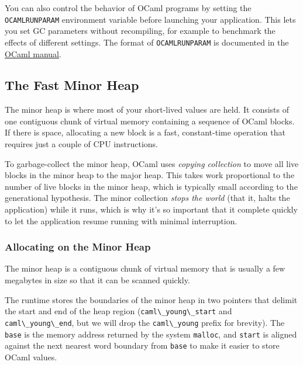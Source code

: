 You can also control the behavior of OCaml programs by setting the
\passthrough{\lstinline!OCAMLRUNPARAM!} environment variable before
launching your application. This lets you set GC parameters without
recompiling, for example to benchmark the effects of different settings.
The format of \passthrough{\lstinline!OCAMLRUNPARAM!} is documented in
the
\href{https://caml.inria.fr/pub/docs/manual-ocaml/runtime.html}{OCaml
manual}.

\hypertarget{the-fast-minor-heap}{%
\subsection{The Fast Minor Heap}\label{the-fast-minor-heap}}

The minor heap is where most of your short-lived values are held. It
consists of one contiguous chunk of virtual memory containing a sequence
of OCaml blocks. If there is space, allocating a new block is a fast,
constant-time operation that requires just a couple of CPU instructions.

To garbage-collect the minor heap, OCaml uses \emph{copying collection}
to move all live blocks in the minor heap to the major heap. This takes
work proportional to the number of live blocks in the minor heap, which
is typically small according to the generational hypothesis. The minor
collection \emph{stops the world} (that it, halts the application) while
it runs, which is why it's so important that it complete quickly to let
the application resume running with minimal interruption.

\hypertarget{allocating-on-the-minor-heap}{%
\subsubsection{Allocating on the Minor
Heap}\label{allocating-on-the-minor-heap}}

The minor heap is a contiguous chunk of virtual memory that is usually a
few megabytes in size so that it can be scanned quickly.

The runtime stores the boundaries of the minor heap in two pointers that
delimit the start and end of the heap region
(\passthrough{\lstinline!caml\_young\_start!} and
\passthrough{\lstinline!caml\_young\_end!}, but we will drop the
\passthrough{\lstinline!caml\_young!} prefix for brevity). The
\passthrough{\lstinline!base!} is the memory address returned by the
system \passthrough{\lstinline!malloc!}, and
\passthrough{\lstinline!start!} is aligned against the next nearest word
boundary from \passthrough{\lstinline!base!} to make it easier to store
OCaml values.

